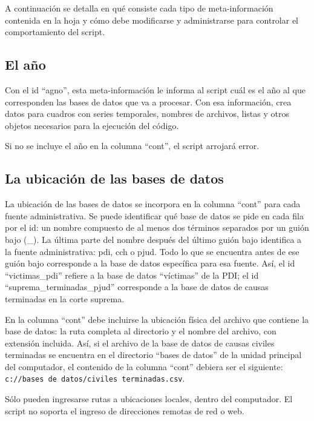 \documentclass[
  spanish,
]{book}
\begin{document}
A continuación se detalla en qué consiste cada tipo de meta-información contenida en la hoja y cómo debe modificarse y administrarse para controlar el comportamiento del script.

\hypertarget{el-auxf1o}{%
\subsection{El año}\label{el-auxf1o}}

Con el id ``agno'', esta meta-información le informa al script cuál es el año al que corresponden las bases de datos que va a procesar. Con esa información, crea datos para cuadros con series temporales, nombres de archivos, listas y otros objetos necesarios para la ejecución del código.

Si no se incluye el año en la columna ``cont'', el script arrojará error.

\hypertarget{la-ubicaciuxf3n-de-las-bases-de-datos}{%
\subsection{La ubicación de las bases de datos}\label{la-ubicaciuxf3n-de-las-bases-de-datos}}

La ubicación de las bases de datos se incorpora en la columna ``cont'' para cada fuente administrativa. Se puede identificar qué base de datos se pide en cada fila por el id: un nombre compuesto de al menos dos términos separados por un guión bajo (\_). La última parte del nombre después del último guión bajo identifica a la fuente administrativa: pdi, cch o pjud. Todo lo que se encuentra antes de ese guión bajo corresponde a la base de datos específica para esa fuente. Así, el id ``victimas\_pdi'' refiere a la base de datos ``víctimas'' de la PDI; el id ``suprema\_terminadas\_pjud'' corresponde a la base de datos de causas terminadas en la corte suprema.

En la columna ``cont'' debe incluirse la ubicación física del archivo que contiene la base de datos: la ruta completa al directorio y el nombre del archivo, con extensión incluida. Así, si el archivo de la base de datos de causas civiles terminadas se encuentra en el directorio ``bases de datos'' de la unidad principal del computador, el contenido de la columna ``cont'' debiera ser el siguiente: \texttt{c://bases\ de\ datos/civiles\ terminadas.csv}.

Sólo pueden ingresarse rutas a ubicaciones locales, dentro del computador. El script no soporta el ingreso de direcciones remotas de red o web.
\end{document}
